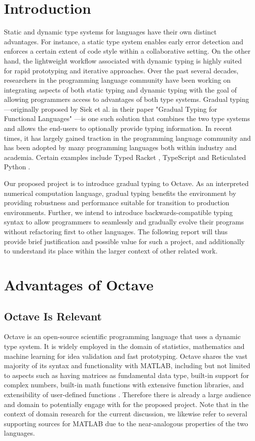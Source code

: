 \section{Introduction}
Static and dynamic type systems for languages have their own distinct advantages. For instance, a static type system enables early error detection and enforces a certain extent of code style within a collaborative setting. On the other hand, the lightweight workflow associated with dynamic typing is highly suited for rapid prototyping and iterative approaches. Over the past several decades, researchers in the programming language community have been working on integrating aspects of both static typing and dynamic typing with the goal of allowing programmers access to advantages of both type systems. Gradual typing---originally proposed by Siek et al. in their paper "Gradual Typing for Functional Languages" \cite{siek2006gradual}---is one such solution that combines the two type systems and allows the end-users to optionally provide typing information. In recent times, it has largely gained traction in the programming language community and has been adopted by many programming languages both within industry and academia. Certain examples include Typed Racket \cite{tobin2006interlanguage}, TypeScript \cite{bierman2014understanding} and Reticulated Python \cite{vitousek2014design}.

Our proposed project is to introduce gradual typing to Octave. As an interpreted numerical computation language, gradual typing benefits the environment by providing robustness and performance suitable for transition to production environments. Further, we intend to introduce backwards-compatible typing syntax to allow programmers to seamlessly and gradually evolve their programs without refactoring first to other languages. The following report will thus provide brief justification and possible value for such a project, and additionally to understand its place within the larger context of other related work.

\section{Advantages of Octave}
\subsection{Octave Is Relevant}
Octave is an open-source scientific programming language that uses a dynamic type system. It is widely employed in the domain of statistics, mathematics and machine learning for idea validation and fast prototyping. Octave shares the vast majority of its syntax and functionality with MATLAB, including but not limited to aspects such as having matrices as fundamental data type, built-in support for complex numbers, built-in math functions with extensive function libraries, and extensibility of user-defined functions \cite{wikibooks}. Therefore there is already a large audience and domain to potentially engage with for the proposed project. Note that in the context of domain research for the current discussion, we likewise refer to several supporting sources for MATLAB due to the near-analogous properties of the two languages.

